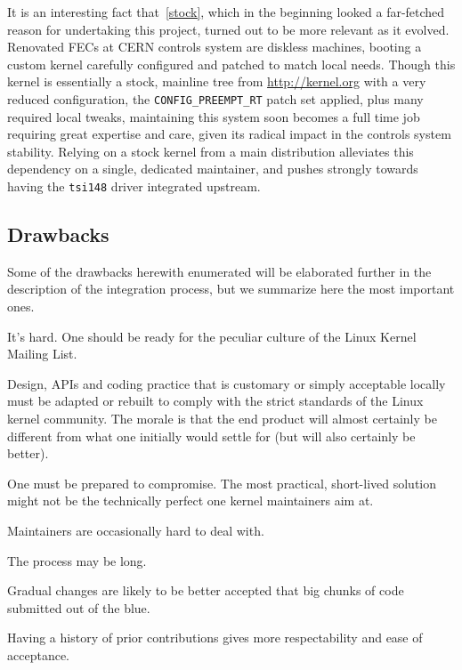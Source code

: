 \documentclass{JAC2003}
\begin{document}
It is an interesting fact that~\ref{stock}, which in the beginning
looked a
far-fetched reason for undertaking this project, turned out to be more
relevant as it evolved. Renovated FECs at CERN controls system
are diskless machines, booting a custom kernel carefully configured and
patched to match local needs. Though this kernel is essentially a stock,
mainline tree from \url{http://kernel.org} with a very reduced 
configuration, the \verb|CONFIG_PREEMPT_RT|
patch set applied, plus many required local
tweaks, maintaining this system soon becomes a full time job requiring
great expertise and care, given its radical impact in the controls
system stability. Relying on a stock kernel from a main
distribution alleviates this dependency on a single, dedicated
maintainer, and pushes strongly towards having the \texttt{tsi148}
driver integrated upstream.

\subsection{Drawbacks}

Some of the drawbacks herewith enumerated will be elaborated further in
the description of the integration process, but we summarize here the
most important ones.

\begin{Itemize}
\item It's hard. One should be ready for the peculiar culture of the
    Linux Kernel Mailing List.
\item Design, APIs and coding practice that is customary or simply 
    acceptable locally must be adapted or rebuilt to comply with the
    strict standards of the Linux kernel community. The morale
    is that the end product will almost certainly be different from what one
    initially would settle for (but will also certainly be better).
\item One must be prepared to compromise. The most practical,
    short-lived solution might not be the technically perfect one kernel
    maintainers aim at.
\item Maintainers are occasionally hard to deal with.
\item The process may be long.
\item Gradual changes are likely to be better accepted that big chunks
    of code submitted out of the blue.  
\item Having a history of prior contributions gives more respectability
    and ease of acceptance.
\end{Itemize}
\end{document}
